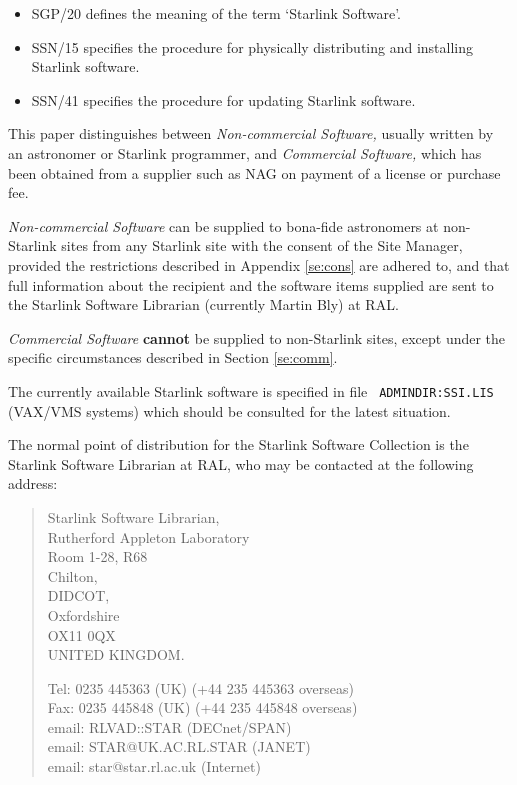 \begin{itemize}
\item SGP/20 defines the meaning of the term `Starlink Software'.
\item SSN/15 specifies the procedure for physically distributing and installing
Starlink software.
\item SSN/41 specifies the procedure for updating Starlink software.
\end{itemize}

This paper distinguishes between {\em Non-commercial Software,} usually written
by an astronomer or Starlink programmer, and {\em Commercial Software,} which
has been obtained from a supplier such as NAG on payment of a license or
purchase fee.

{\em Non-commercial Software} can be supplied to bona-fide astronomers at
non-Starlink sites from any Starlink site with the consent of the Site Manager,
provided the restrictions described in Appendix \ref{se:cons} are adhered to,
and that full information about the recipient and the software items supplied
are sent to the Starlink Software Librarian (currently Martin Bly) at RAL.

{\em Commercial Software} {\bf cannot} be supplied to non-Starlink sites,
except under the specific circumstances described in Section \ref{se:comm}.

The currently available Starlink software is specified in file  {\tt
ADMINDIR:SSI.LIS} (VAX/VMS systems) which should be consulted for the latest
situation.

The normal point of distribution for the Starlink Software Collection is the
Starlink Software Librarian at RAL, who may be contacted at the following
address:\label{pa:add} 

\begin{verse}
Starlink Software Librarian,\\
Rutherford Appleton Laboratory \\
Room 1-28, R68 \\
Chilton, \\
DIDCOT, \\
Oxfordshire \\
OX11 0QX \\
UNITED KINGDOM.


Tel: 0235 445363 (UK) \quad (+44 235 445363 overseas) \\
Fax: 0235 445848 (UK) \quad (+44 235 445848 overseas) \\
email: RLVAD::STAR \quad (DECnet/SPAN) \\
email: STAR@UK.AC.RL.STAR \quad (JANET) \\
email: star@star.rl.ac.uk \quad (Internet)
\end{verse}

